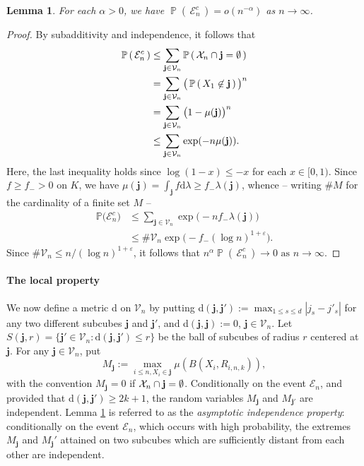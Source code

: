 \documentclass{article}
\theoremstyle{thm}
\newtheorem{lemma}[theorem]{Lemma}
\theoremstyle{definition}
\theoremstyle{definition}
\theoremstyle{def}
\newcommand{\PP}{\mathbb{P}} %
\newcommand{\jj}{\mathbf{j}}
\newcommand{\VV}{\mathcal{V}_n}
\newcommand{\PPP}[1]{\operatorname{\mathbb{P}}\left(\,#1\,\right)}
\begin{document}
\begin{lemma}
\label{Le:independence}
For each $\alpha>0$, we have $\PPP{\mathcal{E}_n^c}=o(n^{-\alpha})$ as $n \to \infty$.
\end{lemma}

\begin{proof}
By subadditivity and independence, it follows that
\begin{align*}
\PPP{\mathcal{E}_n^c} & \leq \sum_{\jj\in \VV}\PPP{{\cal X}_n\cap \jj=\emptyset}\\
& = \sum_{\jj\in \VV}\big(  \PPP{X_1\not\in \jj} \big)^n\\
& = \sum_{\jj\in \VV} \big(1-\mu(\jj)\big)^n\\
& \leq \sum_{\jj\in \VV} \exp(-n\mu(\jj)).
\end{align*}
Here, the last inequality holds since $\log(1-x)\leq -x$ for each $x\in [0,1)$. Since $f\geq f_- >0$ on $K$, we have
$\mu(\jj)=\int_\jj f \text{d} \lambda \geq f_- \lambda(\jj)$, whence -- writing $\# M$ for the cardinality of a finite set $M$ --
\begin{align*}
\PP \big(\mathcal{E}_n^c\big) & \leq \sum_{\jj\in \VV} \exp\big(-n f_- \lambda(\jj)\big)\\
&\leq \#\VV \exp\big(- f_-(\log n)^{1+\varepsilon}\big).
\end{align*}
Since  $\#\VV\leq n/(\log n)^{1+\varepsilon}$, it follows that $n^\alpha \PPP{\mathcal{E}_n^c} \to 0  \text{ as }  n \to \infty$.
\end{proof}





\paragraph{The local property}
We now define a metric d on $\VV$ by putting d$(\jj,\jj'):=\max_{1\leq s\leq d}|j_{s}-j'_{s}|$ for any two different subcubes $\jj$ and $\jj'$, and
d$(\jj,\jj):= 0$, $\jj \in \VV$. Let $S(\jj, r) = \{\jj'\in \VV: \text{d}(\jj, \jj')\leq r\}$ be the ball of subcubes of radius $r$ centered at $\jj$.
For any $\jj\in \VV$, put
\[
M_\jj := \max_{i\leq n, X_i\in \jj} \mu(B(X_i,R_{i,n,k})),
\]
with the convention $M_\jj=0$ if ${\cal X}_n\cap \jj=\emptyset$. Conditionally on the event $\mathcal{E}_n$, and provided that d$(\jj,\jj')\geq 2k+1$,
the random variables $M_\jj$ and $M_{\jj'}$ are independent. Lemma \ref{Le:independence} is referred to as the \textit{asymptotic independence property}: conditionally on the event $\mathcal{E}_n$, which occurs with high probability, the extremes $M_\jj$ and $M_\jj'$ attained on two subcubes which are sufficiently distant from each other are independent.
\end{document}
